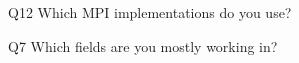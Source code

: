 \begin{description}%
\item{Q12} Which MPI implementations do you use?%
\item{Q7} Which fields are you mostly working in?%
\end{description}%
